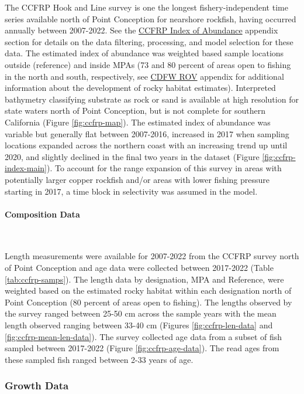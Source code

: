 \documentclass[11pt,
  letterpaper,
]{article}
\begin{document}
The CCFRP Hook and Line survey is one the longest fishery-independent time series available north of Point Conception for nearshore rockfish, having occurred annually between 2007-2022. See the \hyperref[ccfrp-index]{CCFRP Index of Abundance} appendix section for details on the data filtering, processing, and model selection for these data. The estimated index of abundance was weighted based sample locations outside (reference) and inside MPAs (73 and 80 percent of areas open to fishing in the north and south, respectively, see \href{cdfw-rov-index}{CDFW ROV} appendix for additional information about the development of rocky habitat estimates). Interpreted bathymetry classifying substrate as rock or sand is available at high resolution for state waters north of Point Conception, but is not complete for southern California (Figure \ref{fig:ccfrp-map}). The estimated index of abundance was variable but generally flat between 2007-2016, increased in 2017 when sampling locations expanded across the northern coast with an increasing trend up until 2020, and slightly declined in the final two years in the dataset (Figure \ref{fig:ccfrp-index-main}). To account for the range expansion of this survey in areas with potentially larger copper rockfish and/or areas with lower fishing pressure starting in 2017, a time block in selectivity was assumed in the model.

\paragraph{Composition Data}\label{composition-data-2}

~

Length measurements were available for 2007-2022 from the CCFRP survey north of Point Conception and age data were collected between 2017-2022 (Table \ref{tab:ccfrp-samps}). The length data by designation, MPA and Reference, were weighted based on the estimated rocky habitat within each designation north of Point Conception (80 percent of areas open to fishing). The lengths observed by the survey ranged between 25-50 cm across the sample years with the mean length observed ranging between 33-40 cm (Figures \ref{fig:ccfrp-len-data} and \ref{fig:ccfrp-mean-len-data}). The survey collected age data from a subset of fish sampled between 2017-2022 (Figure \ref{fig:ccfrp-age-data}). The read ages from these sampled fish ranged between 2-33 years of age.

\subsubsection{Growth Data}\label{growth-data}
\end{document}
